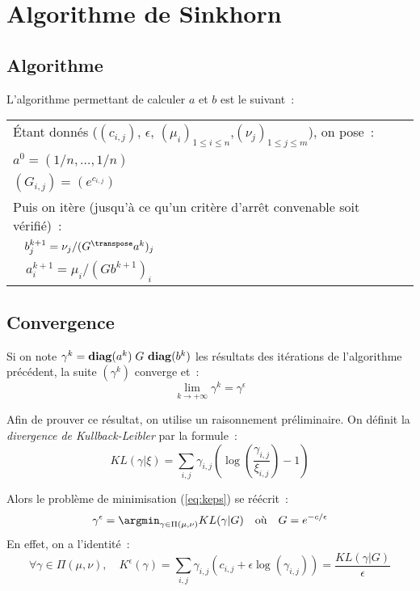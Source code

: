 \section{Algorithme de Sinkhorn}

\subsection{Algorithme}
L'algorithme permettant de calculer $a$ et $b$ est le suivant~:

\begin{tabular}{|p{\textwidth}|}
\hline \vspace{0pt}
 \label{algorithme}
\'Etant donnés ($(c_{i,j})$, $\epsilon$, $(\mu_i)_{1\le i \le n}$,$(\nu_j)_{1 \le j \le m}$), on pose~: \\
$a^0 = (1/n, \ldots, 1/n)$\\
$(G_{i,j}) = (e^{c_{i,j}})$\\
Puis on itère (jusqu'à ce qu'un critère d'arrêt convenable soit vérifié)~: \\
$\quad b^{k+1}_j = \nu_j / (G^\transpose a^k)_j$\\
$\quad a^{k+1}_i = \mu_i /(G b^{k+1})_i$ \\
\hline
\end{tabular}

\subsection{Convergence}
\begin{lemma}
\label{lemma:sink_cv}
Si on note $\gamma^k = \operatorname{\mathbf{diag}}(a^k)\;G\,\operatorname{\mathbf{diag}}(b^k)$ les résultats des itérations de l'algorithme précédent, la suite $(\gamma^k)$ converge et~:
\[\lim_{k \rightarrow +\infty} \gamma^k = \gamma^\epsilon\]
\end{lemma}

Afin de prouver ce résultat, on utilise un raisonnement préliminaire.
On définit la \emph{divergence de Kullback-Leibler} par la formule~:
\begin{equation}\label{eq:kl}
KL(\gamma | \xi) = \sum_{i,j} \gamma_{i,j} \left(\log\left(\frac{\gamma_{i,j}}{\xi_{i,j}} \right) -1 \right)
\end{equation}

Alors le problème de minimisation (\ref{eq:keps}) se réécrit~:
\[
\gamma^\epsilon = \argmin_{\gamma \in \Pi(\mu,\nu)} KL(\gamma | G)
\quad \text{où} \quad G = e^{-c/\epsilon}
\]
En effet, on a l'identité~:
\[\forall \gamma \in \Pi(\mu,\nu), 
\quad K^\epsilon(\gamma) 
= \sum_{i,j} \gamma_{i,j} (c_{i,j} + \epsilon \log(\gamma_{i,j}))
= \frac{KL(\gamma | G)}{\epsilon} \]

